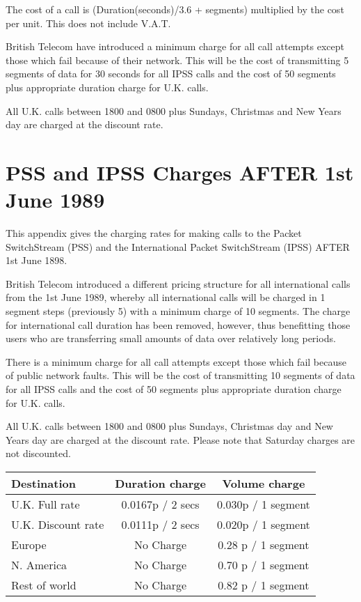   The cost of a call is (Duration(seconds)/3.6 + segments)  multiplied
  by the cost per unit.  This does not include V.A.T.

  British Telecom have introduced a  minimum  charge  for  all  call
  attempts except  those  which  fail  because of their network.  This
  will be the cost of transmitting 5 segments of data for  30  seconds
  for all  IPSS  calls  and  the  cost of 50 segments plus appropriate
  duration charge for U.K.  calls.

  All U.K.  calls between 1800 and 0800 plus  Sundays,  Christmas  and
  New Years day are charged at the discount rate.


\newpage

\section {PSS and IPSS Charges AFTER 1st June 1989}

This appendix gives the charging  rates  for  making  calls  to  the Packet
SwitchStream  (PSS) and the International Packet SwitchStream (IPSS) AFTER
1st June 1898.

British Telecom  introduced  a  different  pricing  structure  for  all
international calls  from  the 1st June 1989, whereby all international
calls will be charged in 1 segment steps (previously 5) with a  minimum
charge of  10 segments.  The charge for international call duration has
been removed,  however,  thus   benefitting   those   users   who   are
transferring small amounts of data over relatively long periods.

There is a minimum charge for all call attempts except those which fail
because of  public  network  faults.   This  will  be   the   cost   of
transmitting 10  segments of data for all IPSS calls and the cost of 50
segments plus appropriate duration charge for U.K.  calls.

All U.K.  calls between 1800 and 0800 plus Sundays, Christmas  day  and
New Years  day  are  charged  at  the  discount rate.  Please note that
Saturday charges are not discounted.

\begin{table}[h]
\begin{center}
\begin{tabular} {||l|c|c||}
\hline
Destination  &  Duration charge   & Volume charge \\
\hline
U.K. Full rate       &   0.0167p /  2 secs   &    0.030p / 1 segment \\
U.K. Discount rate   &   0.0111p /  2 secs   &    0.020p / 1 segment \\
Europe               &   No Charge           &    0.28 p / 1 segment  \\
N. America           &   No Charge           &    0.70 p / 1 segment  \\
Rest of world        &   No Charge           &    0.82 p / 1 segment   \\
\hline
\end{tabular}
\end{center}
\end{table}

